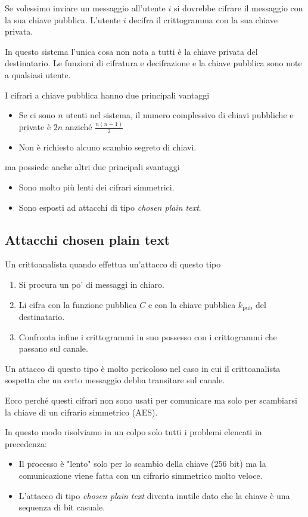 Se volessimo inviare un messaggio all'utente $i$ si dovrebbe cifrare il messaggio con la sua chiave pubblica. L'utente
$i$ decifra il crittogramma con la sua chiave privata.

In questo sistema l'unica cosa non nota a tutti \`e la chiave privata del destinatario. Le funzioni di cifratura e
decifrazione e la chiave pubblica sono note a qualsiasi utente.

I cifrari a chiave pubblica hanno due principali vantaggi
\begin{itemize}
	\item Se ci sono $n$ utenti nel sistema, il numero complessivo di chiavi pubbliche e private \`e $2n$ anzich\'e
	      $\frac{n(n-1)}{2}$
	\item Non \`e richiesto alcuno scambio segreto di chiavi.
\end{itemize}
ma possiede anche altri due principali svantaggi
\begin{itemize}
	\item Sono molto pi\`u lenti dei cifrari simmetrici.
	\item Sono esposti ad attacchi di tipo \emph{chosen plain text}.
\end{itemize}

\subsection{Attacchi chosen plain text}
Un crittoanalista quando effettua un'attacco di questo tipo
\begin{enumerate}
	\item Si procura un po' di messaggi in chiaro.
	\item Li cifra con la funzione pubblica $C$ e con la chiave pubblica $k_{\text{pub}}$ del destinatario.
	\item Confronta infine i crittogrammi in suo possesso con i crittogrammi che passano sul canale.
\end{enumerate}
Un attacco di questo tipo \`e molto pericoloso nel caso in cui il crittoanalista sospetta che un certo messaggio debba
transitare sul canale.

Ecco perch\'e questi cifrari non sono usati per comunicare ma solo per scambiarsi la chiave di un cifrario simmetrico
(AES).

In questo modo risolviamo in un colpo solo tutti i problemi elencati in precedenza:
\begin{itemize}
	\item Il processo \`e "lento" solo per lo scambio della chiave (256 bit) ma la comunicazione viene fatta con un
	      cifrario simmetrico molto veloce.
	\item L'attacco di tipo \emph{chosen plain text} diventa inutile dato che la chiave \`e una sequenza di bit casuale.
\end{itemize}

